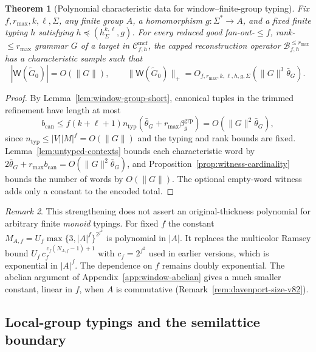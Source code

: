 \documentclass[11pt]{article}
\numberwithin{equation}{section}
\theoremstyle{plain}
\newtheorem{theorem}{Theorem}[section]
\theoremstyle{definition}
\theoremstyle{remark}
\newtheorem{remark}[theorem]{Remark}
\newcommand{\Wit}{\mathsf{W}}
\newcommand{\Cmcf}[2]{\mathcal{C}^{\mathrm{mcf}}_{#1,#2}}
\theoremstyle{plain}
\begin{document}
\begin{theorem}[Polynomial characteristic data for window--finite-group typing]
\label{thm:window-group-polydata-v82}
Fix $f,r_{\max},k,\ell,\Sigma$, any finite group
$A$, a homomorphism $g:\Sigma^*\to A$, and a
fixed finite typing $h$ satisfying
$h\preceq(h_\Sigma^{k,\ell},g)$.
For every reduced good fan-out-$\le f$,
rank-$\le r_{\max}$ grammar $G$ of a target in
$\Cmcf{f}{h}$, the capped reconstruction operator
$\mathcal B^{\le r_{\max}}_{f,h}$ has a characteristic
sample such that
\[
 |\Wit(\widetilde G_0)|=O(\|G\|),\qquad
 \|\Wit(\widetilde G_0)\|_+
 =O_{f,r_{\max},k,\ell,h,g,\Sigma}
   (\|G\|^3\bar\theta_G).
\]
\end{theorem}
\begin{proof}
By Lemma~\ref{lem:window-group-short},
canonical tuples in the trimmed refinement have
length at most
\[
 b_{\mathrm{can}}
 \le f(k+\ell+1)n_{\mathrm{typ}}
 (\bar\theta_G+r_{\max}\beta_g^{\mathrm{grp}})
 =O(\|G\|^2\bar\theta_G),
\]
since $n_{\mathrm{typ}}\le|V||M|^f=O(\|G\|)$
and the typing and rank bounds are fixed.
Lemma~\ref{lem:untyped-contexts} bounds each
characteristic word by
$2\bar\theta_G+r_{\max}b_{\mathrm{can}}
=O(\|G\|^2\bar\theta_G)$, and
Proposition~\ref{prop:witness-cardinality}
bounds the number of words by $O(\|G\|)$.
The optional empty-word witness adds only a
constant to the encoded total.
\end{proof}

\begin{remark}
This strengthening does not assert an original-thickness
polynomial for arbitrary finite \emph{monoid} typings.
For fixed $f$ the constant
$M_{A,f}=U_f\max\{3,|A|^f\}^{2^{f^2}}$ is polynomial in
$|A|$.  It replaces the multicolor Ramsey bound
$U_f\,c_f^{\,c_f(N_{A,f}-1)+1}$ with $c_f=2^{f^2}$ used in
earlier versions, which is exponential in $|A|^f$.  The
dependence on $f$ remains doubly exponential.  The abelian
argument of Appendix~\ref{app:window-abelian} gives a much
smaller constant, linear in $f$, when $A$ is commutative
(Remark~\ref{rem:davenport-size-v82}).
\end{remark}


\subsection{Local-group typings and the semilattice boundary}
\label{app:local-group-v82}
\end{document}
